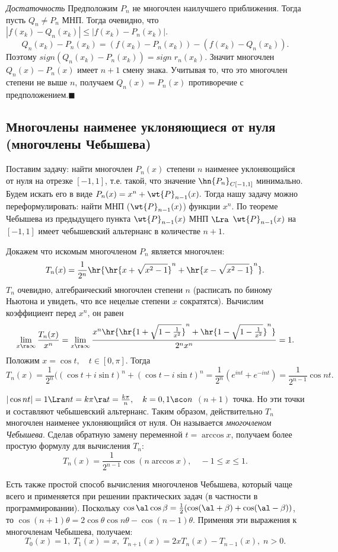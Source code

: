 \documentclass[a4paper]{article}
\begin{document}
\emph{Достаточность} Предположим $P_n$ не многочлен наилучшего
приближения. Тогда пусть $Q_n\neq P_n$ МНП. Тогда очевидно, что
$|f(x_k)-Q_n(x_k)|\le|f(x_k)-P_n(x_k)|.$
$$Q_n(x_k)-P_n(x_k)=(f(x_k)-P_n(x_k))-(f(x_k)-Q_n(x_k)).$$
Поэтому $sign(Q_n(x_k)-P_n(x_k))=sign\; r_n(x_k)$. Значит
многочлен $Q_n(x)-P_n(x)$ имеет $n+1$ смену знака. Учитывая то,
что это многочлен степени не выше $n$, получаем $Q_n(x)=P_n(x)$ противоречие с предположением.$\blacksquare$

\subsection{Многочлены наименее уклоняющиеся от нуля (многочлены Чебышева)}
Поставим задачу: найти многочлен $P_n(x)$ степени $n$ наименее
уклоняющийся от нуля на отрезке $[-1,1]$, т.е. такой, что значение
$\hn{P_n}_{C[-1,1]}$ минимально. Будем искать его в виде
$P_n(x)=x^n+\wt{P}_{n-1}(x).$ Тогда нашу задачу можно
переформулировать: найти МНП ($\wt{P}_{n-1}(x)$) функции
$x^n$. По теореме Чебышева из предыдущего пункта
$\wt{P}_{n-1}(x)$ МНП $\Lra$
$\wt{P}_{n-1}(x)$ на $[-1,1]$ имеет чебышевский альтернанс
в количестве $n+1$.

Докажем что искомым многочленом $P_n$ является многочлен:
$$T_n(x)=\frac1{2^n}\hr{\hr{x+\sqrt{x^2-1}}^n+\hr{x-\sqrt{x^2-1}}^n}.$$
$T_n$ очевидно, алгебраический многочлен степени $n$ (расписать
по биному Ньютона и увидеть, что все нецелые степени $x$
сократятся). Вычислим коэффициент перед $x^n$, он равен
$$\lim_{x\ra\infty}\frac{T_n(x)}{x^n}=\lim_{x\ra\infty}\frac{x^n\hr{\hr{1+\sqrt{1-\frac1{x^2}}}^n+\hr{1-\sqrt{1-\frac1{x^2}}}^n}}{2^nx^n}=1.$$
Положим $x=\cos t,\quad t\in[0,\pi]$. Тогда
$$T_n(x)=\frac1{2^n}((\cos t+i\sin t)^n+(\cos t-i\sin
t)^n=\frac1{2^n}(e^{int}+e^{-int})=\frac1{2^{n-1}}\cos nt.$$

$|\cos nt|=1\Lra nt=k\pi\ra t=\frac{k\pi}n,\quad k=0,1\sco n$ $(n+1)$ точка. Но эти
точки и составляют чебышевский альтернанс. Таким образом, действительно $T_n$ многочлен наименее
уклоняющийся от нуля. Он называется \emph{многочленом Чебышева}. Сделав обратную замену переменной $t=\arccos
x$, получаем более простую формулу для вычисления $T_n$:
$$T_n(x)=\frac1{2^{n-1}}\cos(n\arccos x),\quad -1\le x\le1.$$

Есть также простой способ вычисления многочленов Чебышева, который
чаще всего и применяется при решении практических задач (в
частности в программировании). Поскольку
$\cos\al\cos\beta=\frac12(\cos(\al+\beta)+\cos(\al-\beta))$,
то $\cos(n+1)\theta=2\cos\theta\cos n\theta-\cos(n-1)\theta.$
Применяя эти выражения к многочленам Чебышева, получаем:
$$T_0(x)=1,\;T_1(x)=x,\;T_{n+1}(x)=2xT_n(x)-T_{n-1}(x),\;n>0.$$
\end{document}
